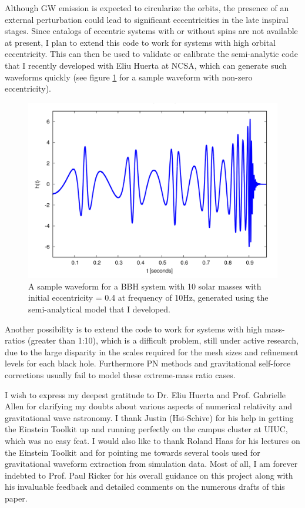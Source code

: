 \documentclass[aps,twocolumn,secnumarabic,nobalancelastpage,amsmath,amssymb,
nofootinbib]{revtex4}
\begin{document}
	Although GW emission is expected to circularize the orbits, the presence of an external perturbation could lead to significant eccentricities in the late inspiral stages. Since catalogs of eccentric systems with or without spins are not available at present, I plan to extend this code to work for systems with high orbital eccentricity. This can then be used to validate or calibrate the semi-analytic code that I recently developed with Eliu Huerta at NCSA, which can generate such waveforms quickly (see figure \ref{ecc} for a sample waveform with non-zero eccentricity).
	\newline
	\begin{figure}[ht]
		\includegraphics[width=\linewidth]{ecc.png}
		\caption{A sample waveform for a BBH system with 10 solar masses with initial eccentricity = 0.4 at frequency of 10Hz, generated using the semi-analytical model that I developed.}
		\label{ecc}
	\end{figure}
	
	Another possibility is to extend the code to work for systems with high mass-ratios (greater than 1:10), which is a difficult problem, still under active research, due to the large disparity in the scales required for the mesh sizes and refinement levels for each black hole. Furthermore PN methods and gravitational self-force corrections usually fail to model these extreme-mass ratio cases.
	
	
	
	\begin{acknowledgments} I wish to express my deepest gratitude to Dr. Eliu Huerta and Prof. Gabrielle Allen for clarifying my doubts about various aspects of numerical relativity and gravitational wave astronomy. I thank Justin (Hsi-Schive) for his help in getting the Einstein Toolkit up and running perfectly on the campus cluster at UIUC, which was no easy feat. I would also like to thank Roland Haas for his lectures on the Einstein Toolkit and for pointing me towards several tools used for gravitational waveform extraction from simulation data. Most of all, I am forever indebted to Prof. Paul Ricker for his overall guidance on this project along with his invaluable feedback and detailed comments on the numerous drafts of this paper.
		\newpage
	\end{acknowledgments}
	
\end{document}
